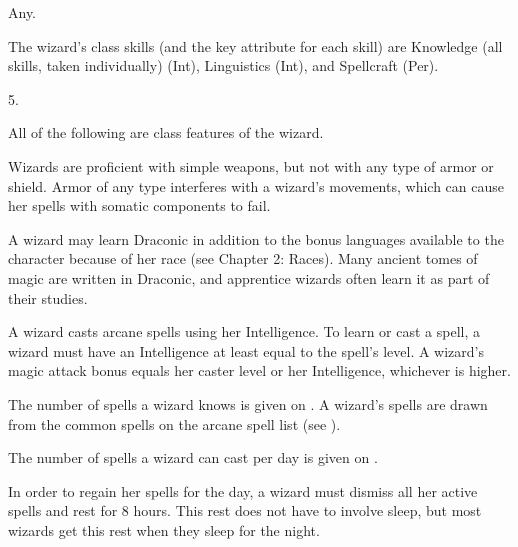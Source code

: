  Any.

The wizard's class skills (and the key attribute for each skill) are
Knowledge (all skills, taken individually) (Int), Linguistics (Int), and Spellcraft (Per).

5.


All of the following are class features of the wizard.

Wizards are proficient with simple weapons, but not with any type of armor or shield.
Armor of any type interferes with a wizard's movements, which can cause her spells with somatic components to fail.

A wizard may learn Draconic in addition to the bonus languages available to the character because of her race (see Chapter 2: Races).
Many ancient tomes of magic are written in Draconic, and apprentice wizards often learn it as part of their studies.

A wizard casts arcane spells using her Intelligence.
To learn or cast a spell, a wizard must have an Intelligence at least equal to the spell's level.
A wizard's magic attack bonus equals her caster level or her Intelligence, whichever is higher.

The number of spells a wizard knows is given on .
A wizard's spells are drawn from the common spells on the arcane spell list (see ).


The number of spells a wizard can cast per day is given on .

In order to regain her spells for the day, a wizard must dismiss all her active spells and rest for 8 hours.
This rest does not have to involve sleep, but most wizards get this rest when they sleep for the night.

